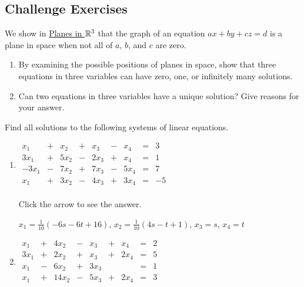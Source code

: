 \documentclass{ximera}
\begin{document}
\subsection*{Challenge Exercises}

\begin{problem}\label{prb:possible}
We show in \href{https://ximera.osu.edu/oerlinalg/LinearAlgebra/RRN-0030/main}{Planes in $\mathbb{R}^3$} that the graph of an equation $ax + by + cz = d$ is a plane in space when not all of $a$, $b$, and $c$ are zero.

\begin{enumerate}
\item By examining the possible positions of planes in space, show that three equations in three variables can have zero, one, or infinitely many solutions.

\item Can two equations in three variables have a unique solution? Give reasons for your answer.
\end{enumerate}
\end{problem}

\begin{problem}\label{prb:systems_review}
Find all solutions to the following systems of linear equations.

\begin{enumerate}
\item

$\begin{array}{rlrlrlrcr}
	  x_1 & + &  x_2 & + &  x_3 & - &  x_4 & = &  3 \\
	 3x_1 & + & 5x_2 & - & 2x_3 & + &  x_4 & = &  1 \\
	-3x_1 & - & 7x_2 & + & 7x_3 & - & 5x_4 & = &  7 \\
	  x_1 & + & 3x_2 & - & 4x_3 & + & 3x_4 & = & -5 \\
\end{array}$

Click the arrow to see the answer.
\begin{expandable}
$x_1 = \frac{1}{10}(-6s - 6t + 16)$, $x_2 = \frac{1}{10}(4s - t + 1)$, $x_3 = s$, $x_4 = t$
\end{expandable}
\item

$\begin{array}{rlrlrlrcr}
	  x_1 & + &  4x_2 & - &   x_3 & + &   x_4 & = &  2 \\
	 3x_1 & + &  2x_2 & + &   x_3 & + &  2x_4 & = &  5 \\
	  x_1 & - &  6x_2 & + &  3x_3 &   &       & = &  1 \\
	  x_1 & + & 14x_2 & - &  5x_3 & + &  2x_4 & = &  3 \\
\end{array}$

\end{enumerate}

\end{problem}
\end{document}
